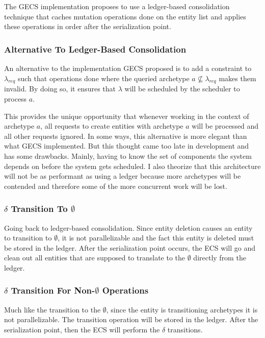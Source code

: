 The GECS implementation proposes to use a ledger-based consolidation technique that caches mutation operations done on the entity list and applies these operations in order after the serialization point.

\subsubsection{Alternative To Ledger-Based Consolidation}
An alternative to the implementation GECS proposed is to add a constraint to $\lambda_{req}$ such that operations done where the queried archetype $a \not\subseteq \lambda_{req}$ makes them invalid. By doing so, it ensures that $\lambda$ will be scheduled by the scheduler to process $a$. 

This provides the unique opportunity that whenever working in the context of archetype $a$, all requests to create entities with archetype $a$ will be processed and all other requests ignored. In some ways, this alternative is more elegant than what GECS implemented. But this thought came too late in development and has some drawbacks. Mainly, having to know the set of components the system depends on before the system gets scheduled. I also theorize that this architecture will not be as performant as using a ledger because more archetypes will be contended and therefore some of the more concurrent work will be lost.

\subsubsection{$\delta$ Transition To $\emptyset$}
Going back to ledger-based consolidation. Since entity deletion causes an entity to transition to $\emptyset$, it is not parallelizable and the fact this entity is deleted must be stored in the ledger. After the serialization point occurs, the ECS will go and clean out all entities that are supposed to translate to the $\emptyset$ directly from the ledger. 

\subsubsection{$\delta$ Transition For Non-$\emptyset$ Operations}
Much like the transition to the $\emptyset$, since the entity is transitioning archetypes it is not parallelizable. The transition operation will be stored in the ledger. After the serialization point, then the ECS will perform the $\delta$ transitions. 
